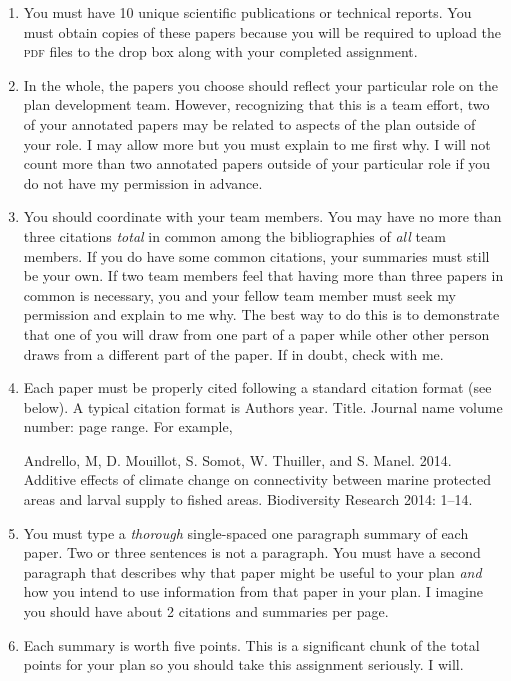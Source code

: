 \documentclass[12pt]{article}
\begin{document}
\begin{enumerate}[leftmargin=*]

\item You must have 10 unique scientific publications or technical reports. You must obtain copies of these papers because you will be required to upload the \textsc{pdf} files to the drop box along with your completed assignment.

\item In the whole, the papers you choose should reflect your particular role on the plan development team. However, recognizing that this is a team effort, two of your annotated papers may be related to aspects of the plan outside of your role. I may allow more but you must explain to me first why. I will not count more than two annotated papers outside of your particular role if you do not have my permission in advance.

\item You should coordinate with your team members. You may have no more than three citations \emph{total} in common among the bibliographies of \emph{all} team members. If you do have some common citations, your summaries must still be your own. If two team members feel that having more than three papers in common is necessary, you and your fellow team member must seek my permission and explain to me why. The best way to do this is to demonstrate that one of you will draw from one part of a paper while other other person draws from a different part of the paper. If in doubt, check with me.

\item Each paper must be properly cited following a standard citation format (see below).  A typical citation format is Authors year. Title. Journal name volume number: page range. For example,

Andrello, M, D. Mouillot, S. Somot, W. Thuiller, and S. Manel. 2014. Additive effects of climate change on connectivity between marine protected areas and larval supply to fished areas. Biodiversity Research 2014: 1–14.

\item You must type a \emph{thorough} single-spaced one paragraph summary of each paper. Two or three sentences is not a paragraph. You must have a second paragraph that describes why that paper might be useful to your plan \emph{and} how you intend to use information from that paper in your plan. I imagine you should have about 2 citations and summaries per page. 

\item Each summary is worth five points. This is a significant chunk of the total points for your plan so you should take this assignment seriously. I will.

\end{enumerate}
\end{document}
